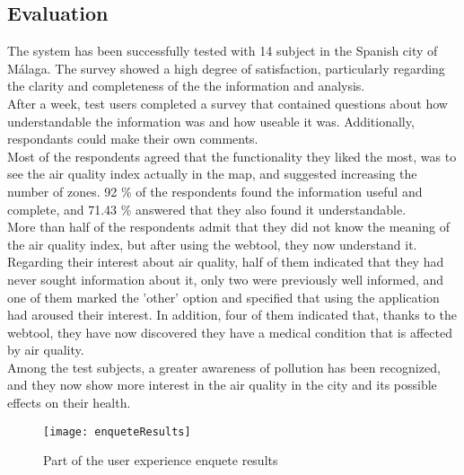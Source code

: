 \subsection*{Evaluation}
The system has been successfully tested with 14 subject in the Spanish city of Málaga. The survey showed a high degree of satisfaction, 
particularly regarding the clarity and completeness of the the information and analysis.\\

After a week, test users completed a survey that contained questions about how understandable the information was
and how useable it was. Additionally, respondants could make their own comments.\\

Most of the respondents agreed that the functionality they liked the most, was to see the air quality index actually in the
map, and suggested increasing the number of zones.
92 \% of the respondents found the information useful and complete, and 71.43 \% answered that they also found it
understandable.\\

More than half of the respondents admit that they did not know the meaning of the air quality index, but after
using the webtool, they now understand it.\\

Regarding their interest about air quality, half of them indicated that they had never sought information about it,
only two were previously well informed, and one of them marked the 'other' option and specified that using the application had aroused their interest.
In addition, four of them indicated that, thanks to the webtool, they have now discovered they have a medical condition that is affected by air quality.\\

Among the test subjects, a greater awareness of pollution has been recognized, and they now show more interest in the
air quality in the city and its possible effects on their health.
\newpage
\begin{figure}[ht]
   \centering
   \texttt{[image: enqueteResults]}
   \caption{Part of the user experience enquete results}
\end{figure}